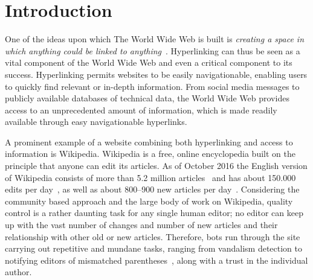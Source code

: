 \chapter{Introduction}
One of the ideas upon which The World Wide Web is built is \emph{creating a space in which anything could be linked to anything}~\cite[ch.~1, p.~4]{Weaving-the-web}. Hyperlinking can thus be seen as a vital component of the World Wide Web and even a critical component to its success. Hyperlinking permits websites to be easily navigationable, enabling users to quickly find relevant or in-depth information. From social media messages to publicly available databases of technical data, the World Wide Web provides access to an unprecedented amount of information, which is made readily available through easy navigationable hyperlinks.

A prominent example of a website combining both hyperlinking and access to information is Wikipedia. Wikipedia is a free, online encyclopedia built on the principle that anyone can edit its articles. As of October 2016 the English version of Wikipedia consists of more than 5.2 million articles~\cite{wiki-about} and has about 150.000 edits per day~\cite{wiki-num-edits}, as well as about 800--900 new articles per day~\cite{wmcharts}. Considering the community based approach and the large body of work on Wikipedia, quality control is a rather daunting task for any single human editor; no editor can keep up with the vast number of changes and number of new articles and their relationship with other old or new articles. Therefore, bots run through the site carrying out repetitive and mundane tasks, ranging from vandalism detection to notifying editors of mismatched parentheses~\cite{wiki-bots}, along with a trust in the individual author.

